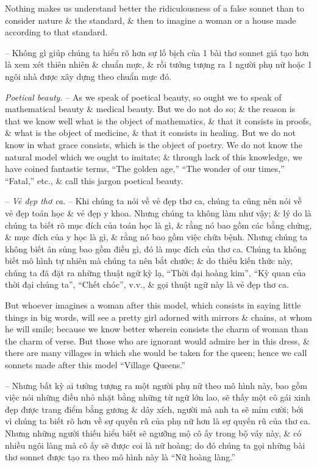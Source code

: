 \documentclass{article}
\begin{document}
\begin{enumerate}
\begin{itemize}
		Nothing makes us understand better the ridiculousness of a false sonnet than to consider nature \& the standard, \& then to imagine a woman or a house made according to that standard.
		
		-- Không gì giúp chúng ta hiểu rõ hơn sự lố bịch của 1 bài thơ sonnet giả tạo hơn là xem xét thiên nhiên \& chuẩn mực, \& rồi tưởng tượng ra 1 người phụ nữ hoặc 1 ngôi nhà được xây dựng theo chuẩn mực đó.
		
		 {\it Poetical beauty.} -- As we speak of poetical beauty, so ought we to speak of mathematical beauty \& medical beauty. But we do not do so; \& the reason is that we know well what is the object of mathematics, \& that it consists in proofs, \& what is the object of medicine, \& that it consists in healing. But we do not know in what grace consists, which is the object of poetry. We do not know the natural model which we ought to imitate; \& through lack of this knowledge, we have coined fantastic terms, ``The golden age,'' ``The wonder of our times,'' ``Fatal,'' etc., \& call this jargon poetical beauty.
		
		-- {\it Vẻ đẹp thơ ca.} -- Khi chúng ta nói về vẻ đẹp thơ ca, chúng ta cũng nên nói về vẻ đẹp toán học \& vẻ đẹp y khoa. Nhưng chúng ta không làm như vậy; \& lý do là chúng ta biết rõ mục đích của toán học là gì, \& rằng nó bao gồm các bằng chứng, \& mục đích của y học là gì, \& rằng nó bao gồm việc chữa bệnh. Nhưng chúng ta không biết ân sủng bao gồm điều gì, đó là mục đích của thơ ca. Chúng ta không biết mô hình tự nhiên mà chúng ta nên bắt chước; \& do thiếu kiến thức này, chúng ta đã đặt ra những thuật ngữ kỳ lạ, ``Thời đại hoàng kim'', ``Kỳ quan của thời đại chúng ta'', ``Chết chóc'', v.v., \& gọi thuật ngữ này là vẻ đẹp thơ ca.
		
		But whoever imagines a woman after this model, which consists in saying little things in big words, will see a pretty girl adorned with mirrors \& chains, at whom he will smile; because we know better wherein consists the charm of woman than the charm of verse. But those who are ignorant would admire her in this dress, \& there are many villages in which she would be taken for the queen; hence we call sonnets made after this model ``Village Queens.''
		
		-- Nhưng bất kỳ ai tưởng tượng ra một người phụ nữ theo mô hình này, bao gồm việc nói những điều nhỏ nhặt bằng những từ ngữ lớn lao, sẽ thấy một cô gái xinh đẹp được trang điểm bằng gương \& dây xích, người mà anh ta sẽ mỉm cười; bởi vì chúng ta biết rõ hơn về sự quyến rũ của phụ nữ hơn là sự quyến rũ của thơ ca. Nhưng những người thiếu hiểu biết sẽ ngưỡng mộ cô ấy trong bộ váy này, \& có nhiều ngôi làng mà cô ấy sẽ được coi là nữ hoàng; do đó chúng ta gọi những bài thơ sonnet được tạo ra theo mô hình này là ``Nữ hoàng làng.''		
		 

\end{itemize}
\end{enumerate}
\end{document}
